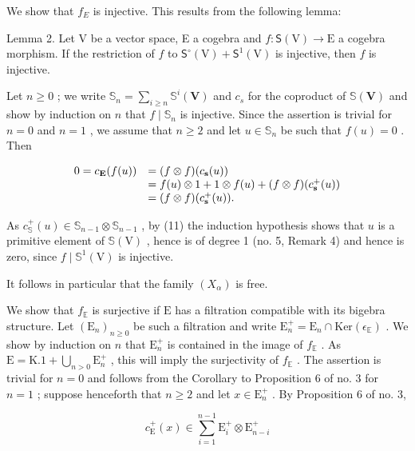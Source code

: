 We show that \(f_{E}\) is injective. This results from the following lemma:

Lemma 2. Let V be a vector space, E a cogebra and \(f\colon\mathsf{S}(\mathrm{V})\to\mathrm{E}\) a cogebra morphism. If the restriction of \(f\) to \(\mathsf{S}^{\circ}(\mathrm{V})+\mathsf{S}^{1}(\mathrm{V})\) is injective, then \(f\) is injective.

Let \(n \geqslant 0\) ; we write \(\mathbb{S}_n = \sum_{i \geqslant n} \mathbb{S}^i(\mathbf{V})\) and \(c_s\) for the coproduct of \(\mathbb{S}(\mathbf{V})\) and show by induction on \(n\) that \(f \mid \mathbb{S}_n\) is injective. Since the assertion is trivial for \(n = 0\) and \(n = 1\) , we assume that \(n \geqslant 2\) and let \(u \in \mathbb{S}_n\) be such that \(f(u) = 0\) . Then

\[
\begin{array}{r l} {0 = c _ {\mathbf {E}} (f (u))} & {= (f \otimes f) (c _ {\mathbf {s}} (u))} \\ & {= f (u) \otimes 1 + 1 \otimes f (u) + (f \otimes f) (c _ {\mathbf {s}} ^ {+} (u))} \\ & {= (f \otimes f) (c _ {\mathbf {s}} ^ {+} (u)).} \end{array}
\]

As \(c_{\mathbb{S}}^{+}(u) \in \mathbb{S}_{n-1} \otimes \mathbb{S}_{n-1}\) , by (11) the induction hypothesis shows that \(u\) is a primitive element of \(\mathbb{S}(\mathrm{V})\) , hence is of degree 1 (no. 5, Remark 4) and hence is zero, since \(f \mid \mathbb{S}^1(\mathrm{V})\) is injective.

It follows in particular that the family \((X_{\alpha})\) is free.

We show that \(f_{\mathbb{E}}\) is surjective if \(\mathrm{E}\) has a filtration compatible with its bigebra structure. Let \((\mathrm{E}_n)_{n\geqslant 0}\) be such a filtration and write \(\mathrm{E}_n^+ = \mathrm{E}_n\cap \mathrm{Ker}(\epsilon_{\mathbb{E}})\) . We show by induction on \(n\) that \(\mathrm{E}_n^+\) is contained in the image of \(f_{\mathbb{E}}\) . As \(\mathrm{E} = \mathrm{K}.1 + \bigcup_{n > 0}\mathrm{E}_n^+\) , this will imply the surjectivity of \(f_{\mathbb{E}}\) . The assertion is trivial for \(n = 0\) and follows from the Corollary to Proposition 6 of no. 3 for \(n = 1\) ; suppose henceforth that \(n\geqslant 2\) and let \(x\in \mathrm{E}_n^+\) . By Proposition 6 of no. 3,

\[
c _ {\mathrm{E}} ^ {+} (x) \in \sum_ {i = 1} ^ {n - 1} \mathrm{E} _ {i} ^ {+} \otimes \mathrm{E} _ {n - i} ^ {+}
\]

